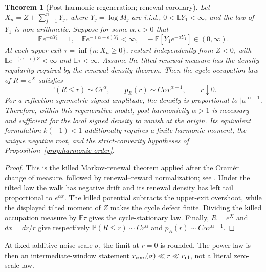 \documentclass[10pt]{article}
\newtheorem{theorem}{Theorem}[section]
\theoremstyle{definition}
\theoremstyle{remark}
\newcommand{\E}{\mathbb E}
\newcommand{\Pp}{\mathbb P}
\begin{document}
\begin{theorem}[Post-harmonic regeneration; renewal corollary]
\label{thm:regeneration}
Let $X_n=Z+\sum_{j=1}^nY_j$, where $Y_j=\log M_j$ are i.i.d.,
$0<\E Y_1<\infty$, and the law of $Y_1$ is non-arithmetic.  Suppose for some
$\alpha,\epsilon>0$ that
\begin{equation}
 \E e^{-\alpha Y_1}=1,
 \quad \E e^{-(\alpha+\epsilon)Y_1}<\infty,
 \quad -\E[Y_1e^{-\alpha Y_1}]\in(0,\infty).
 \label{eq:cramer}
\end{equation}
At each upper exit $\tau=\inf\{n:X_n\ge0\}$, restart independently from
$Z<0$, with $\E e^{-(\alpha+\epsilon)Z}<\infty$ and $\E\tau<\infty$.
Assume the tilted renewal measure has the density regularity required by the
renewal-density theorem.  Then the cycle-occupation law of $R=e^X$ satisfies
\begin{equation}
 \Pp(R\le r)\sim C r^\alpha,
 \qquad p_R(r)\sim C\alpha r^{\alpha-1},
 \qquad r\downarrow0.
 \label{eq:scalar-small-ball}
\end{equation}
For a reflection-symmetric signed amplitude, the density is proportional to
$|a|^{\alpha-1}$.  Therefore, within this regenerative model, post-harmonicity
$\alpha>1$ is necessary and sufficient for the local signed density to vanish
at the origin.  Its equivalent formulation $k(-1)<1$ additionally requires a
finite harmonic moment, the unique negative root, and the strict-convexity
hypotheses of Proposition~\ref{prop:harmonic-order}.
\end{theorem}

\begin{proof}
This is the killed Markov-renewal theorem applied after the Cram\'er change of
measure, followed by renewal--reward normalization; see
\cite{Kesten1974,NeyNummelin1987a,NeyNummelin1987b,Alsmeyer1994}.  Under the
tilted law the walk has negative drift and its renewal density has left tail
proportional to $e^{\alpha x}$.  The killed potential subtracts the upper-exit
overshoot, while the displayed tilted moment of $Z$ makes the cycle defect
finite.  Dividing the killed occupation measure by $\E\tau$ gives the
cycle-stationary law.  Finally, $R=e^X$ and $dx=dr/r$ give respectively
$\Pp(R\le r)\sim Cr^\alpha$ and
$p_R(r)\sim C\alpha r^{\alpha-1}$.
\end{proof}

At fixed additive-noise scale $\sigma$, the limit at $r=0$ is rounded.  The
power law is then an intermediate-window statement
$r_{\rm core}(\sigma)\ll r\ll r_{\rm nl}$, not a literal zero-scale law.
\end{document}
